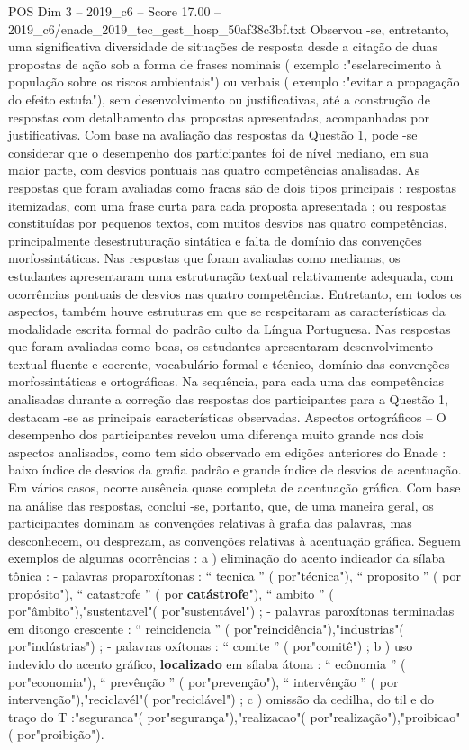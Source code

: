 \begin{textsample}{POS Dim 3 – 2019\_c6 – Score 17.00 – 2019\_c6/enade\_2019\_tec\_gest\_hosp\_50af38c3bf.txt}
Observou -se, entretanto, uma significativa diversidade de situações de resposta desde a citação de duas propostas de ação sob a forma de frases nominais ( exemplo :"esclarecimento à população sobre os riscos ambientais") ou verbais ( exemplo :"evitar a propagação do efeito estufa"), sem desenvolvimento ou justificativas, até a construção de respostas com detalhamento das propostas apresentadas, acompanhadas por justificativas.
Com base na avaliação das respostas da Questão 1, pode -se considerar que o desempenho dos participantes foi de nível mediano, em sua maior parte, com desvios pontuais nas quatro competências analisadas.
As respostas que foram avaliadas como fracas são de dois tipos principais : respostas itemizadas, com uma frase curta para cada proposta apresentada ; ou respostas constituídas por pequenos textos, com muitos desvios nas quatro competências, principalmente desestruturação sintática e falta de domínio das convenções morfossintáticas.
Nas respostas que foram avaliadas como medianas, os estudantes apresentaram uma estruturação textual relativamente adequada, com ocorrências pontuais de desvios nas quatro competências.
Entretanto, em todos os aspectos, também houve estruturas em que se respeitaram as características da modalidade escrita formal do padrão culto da Língua Portuguesa.
Nas respostas que foram avaliadas como boas, os estudantes apresentaram desenvolvimento textual fluente e coerente, vocabulário formal e técnico, domínio das convenções morfossintáticas e ortográficas.
Na sequência, para cada uma das competências analisadas durante a correção das respostas dos participantes para a Questão 1, destacam -se as principais características observadas.
Aspectos ortográficos – O desempenho dos participantes revelou uma diferença muito grande nos dois aspectos analisados, como tem sido observado em edições anteriores do Enade : baixo índice de desvios da grafia padrão e grande índice de desvios de acentuação.
Em vários casos, ocorre ausência quase completa de acentuação gráfica.
Com base na análise das respostas, conclui -se, portanto, que, de uma maneira geral, os participantes dominam as convenções relativas à grafia das palavras, mas desconhecem, ou desprezam, as convenções relativas à acentuação gráfica.
Seguem exemplos de algumas ocorrências : a ) eliminação do acento indicador da sílaba tônica : - palavras proparoxítonas : “ tecnica ” ( por"técnica"), “ proposito ” ( por propósito"), “ catastrofe ” ( por \textbf{catástrofe}"), “ ambito ” ( por"âmbito"),"sustentavel"( por"sustentável") ; - palavras paroxítonas terminadas em ditongo crescente : “ reincidencia ” ( por"reincidência"),"industrias"( por"indústrias") ; - palavras oxítonas : “ comite ” ( por"comitê") ; b ) uso indevido do acento gráfico, \textbf{localizado} em sílaba átona : “ ecônomia ” ( por"economia"), “ prevênção ” ( por"prevenção"), “ intervênção ” ( por intervenção"),"reciclavél"( por"reciclável") ; c ) omissão da cedilha, do til e do traço do T :"seguranca"( por"segurança"),"realizacao"( por"realização"),"proibicao"( por"proibição").

\end{textsample}
